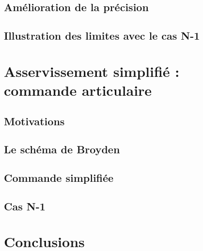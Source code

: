 \subsection{Amélioration de la précision}

\subsection{Illustration des limites avec le cas N-1}


\section{Asservissement simplifié : commande articulaire}

\subsection{Motivations}

\subsection{Le schéma de Broyden}

\subsection{Commande simplifiée}

\subsection{Cas N-1}

\section{Conclusions}